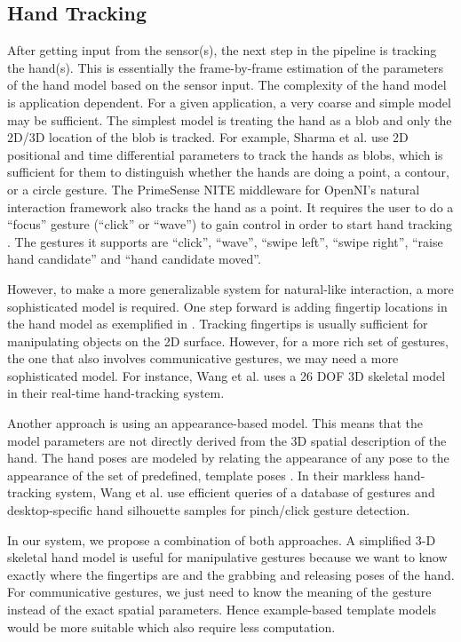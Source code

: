 \subsection{Hand Tracking}
After getting input from the sensor(s), the next step in the pipeline is
tracking the hand(s). This is essentially the frame-by-frame estimation of the
parameters of the hand model based on the sensor input. The complexity of the
hand model is application dependent. For a given application, a very coarse and
simple model may be sufficient. The simplest model is treating the hand as a
blob and only the 2D/3D location of the blob is tracked. For example, Sharma et
al. \cite{sharma00} use 2D positional and time differential parameters to track
the hands as blobs, which is sufficient for them to distinguish whether the
hands are doing a point, a contour, or a circle gesture. The PrimeSense NITE
middleware for OpenNI's natural interaction framework also tracks the hand as a
point. It requires the user to do a ``focus'' gesture (``click'' or ``wave'')
to gain control in order to start hand tracking \cite{primesense-manual}. The
gestures it supports are ``click'', ``wave'', ``swipe left'', ``swipe right'', 
``raise hand candidate'' and ``hand candidate moved''.

However, to make a more generalizable system for natural-like interaction, a
more sophisticated model is required. One step forward is adding fingertip
locations in the hand model as exemplified in \cite{Oka02} \cite{harrison11}
\cite{larson11}. Tracking fingertips is usually sufficient for manipulating
objects on the 2D surface. However, for a more rich set of gestures, the one
that also involves communicative gestures, we may need a more sophisticated
model. For instance, Wang et al. \cite{Wang09} uses a 26 DOF
3D skeletal model in their real-time hand-tracking system. 

Another approach is using an appearance-based model. This means that the model
parameters are not directly derived from the 3D spatial description of the hand.
The hand poses are modeled by relating the appearance of any pose to the 
appearance of the set of predefined, template poses \cite{Pavlovic97}. In
their markless hand-tracking system, Wang et al. \cite{wang11} use efficient
queries of a database of gestures and desktop-specific hand silhouette samples
for pinch/click gesture detection.

In our system, we propose a combination of both approaches. A simplified 3-D
skeletal hand model is useful for manipulative gestures because we want to know 
exactly where the fingertips are and the grabbing and releasing poses of the hand. For
communicative gestures, we just need to know the meaning of the gesture instead
of the exact spatial parameters. Hence example-based template models would be
more suitable which also require less computation.

